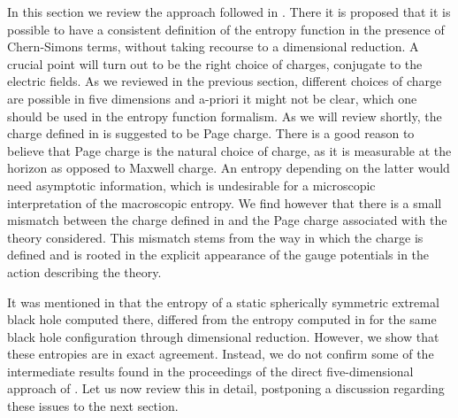 \documentclass[12pt,twoside]{book}
\begin{document}
In this section we review the approach followed in \cite{Arsiwalla:2008gc}. There it is proposed that it is possible to have a consistent definition of the entropy function in the presence of Chern-Simons terms, without taking recourse to a dimensional reduction. A crucial point will turn out to be the right choice of charges, conjugate to the electric fields. As we reviewed in the previous section, different choices of charge are possible in five dimensions and a-priori it might not be clear, which one should be used in the entropy function formalism. As we will review shortly, the charge defined in \cite{Arsiwalla:2008gc} is suggested to be Page charge. There is a good reason to believe that Page charge is the natural choice of charge, as it is measurable at the horizon as opposed to Maxwell charge. An entropy depending on the latter would need asymptotic information, which is undesirable for a microscopic interpretation of the macroscopic entropy. We find however that there is a small mismatch between the charge defined in \cite{Arsiwalla:2008gc} and the Page charge associated with the theory considered. This mismatch stems from the way in which the charge is defined and is rooted in the explicit appearance of the gauge potentials in the action describing the theory.

It was mentioned in \cite{Arsiwalla:2008gc} that the entropy of a static spherically symmetric extremal black hole computed there, differed from the entropy computed in \cite{Goldstein:2007kx} for the same black hole configuration through dimensional reduction. However, we show that these entropies are in exact agreement. Instead, we do not confirm some of the intermediate results found in the proceedings of the direct five-dimensional approach of \cite{Arsiwalla:2008gc}. Let us now review this in detail, postponing a discussion regarding these issues to the next section.\\
\end{document}
